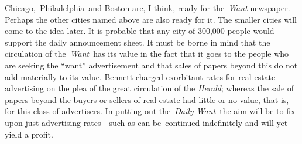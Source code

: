 \documentclass[openany,nobib]{tufte-book}
\begin{document}
Chicago,~Philadelphia~and Boston are, I think, ready for
the~\emph{Want} newspaper. Perhaps the other cities named above are also
ready for it. The smaller cities will come to the idea later. It is
probable that any city of 300,000 people would support the daily
announcement sheet. It must be borne in mind that the circulation of
the~\emph{Want}~has its value in the fact that it goes to the people who
are seeking the ``want'' advertisement and that sales of papers beyond
this do not add materially to its value. Bennett charged exorbitant
rates for real-estate advertising on the plea of the great circulation
of the \emph{Herald}; whereas the sale of papers beyond the buyers or
sellers of real-estate had little or no value, that is, for this class
of advertisers. In putting out the~\emph{Daily Want}~the aim will be to
fix upon just advertising rates---such as can be~continued indefinitely
and will yet yield a profit.~
\end{document}
